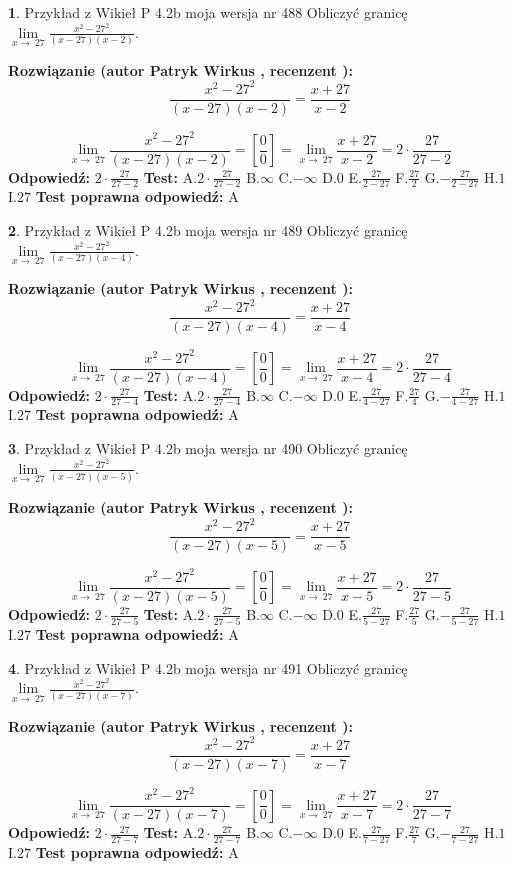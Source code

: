\documentclass[12pt, a4paper]{article}
\theoremstyle{definition} %
\newtheorem{zad}{}
\newcommand{\zadStart}[1]{\begin{zad}#1\newline}
\newcommand{\zadStop}{\end{zad}}
\newcommand{\rozwStart}[2]{\noindent \textbf{Rozwiązanie (autor #1 , recenzent #2): }\newline}
\newcommand{\rozwStop}{\newline}
\newcommand{\odpStart}{\noindent \textbf{Odpowiedź:}\newline}
\newcommand{\odpStop}{\newline}
\newcommand{\testStart}{\noindent \textbf{Test:}\newline}
\newcommand{\testStop}{\newline}
\newcommand{\kluczStart}{\noindent \textbf{Test poprawna odpowiedź:}\newline}
\newcommand{\kluczStop}{\newline}
\begin{document}
\zadStart{Przykład z Wikieł P 4.2b moja wersja nr 488}
Obliczyć granicę $\lim\limits_{x\to\ 27}\frac{x^{2}-27^{2}}{(x-27)(x-2)}$.
\zadStop
\rozwStart{Patryk Wirkus}{}
$$\frac{x^{2}-27^{2}}{(x-27)(x-2)}=\frac{x+27}{x-2}$$

$$\lim\limits_{x\to\ 27}\frac{x^{2}-27^{2}}{(x-27)(x-2)}=[\frac{0}{0}]=\lim\limits_{x\to\ 27}\frac{x+27}{x-2}=2 \cdot \frac{27}{27-2}$$
\rozwStop
\odpStart
$2 \cdot \frac{27}{27-2}$
\odpStop
\testStart
A.$2 \cdot \frac{27}{27-2}$
B.$\infty$
C.$-\infty$
D.$0$
E.$\frac{27}{2-27}$
F.$\frac{27}{2}$
G.$-\frac{27}{2-27}$
H.$1$
I.$27$
\testStop
\kluczStart
A
\kluczStop



\zadStart{Przykład z Wikieł P 4.2b moja wersja nr 489}
Obliczyć granicę $\lim\limits_{x\to\ 27}\frac{x^{2}-27^{2}}{(x-27)(x-4)}$.
\zadStop
\rozwStart{Patryk Wirkus}{}
$$\frac{x^{2}-27^{2}}{(x-27)(x-4)}=\frac{x+27}{x-4}$$

$$\lim\limits_{x\to\ 27}\frac{x^{2}-27^{2}}{(x-27)(x-4)}=[\frac{0}{0}]=\lim\limits_{x\to\ 27}\frac{x+27}{x-4}=2 \cdot \frac{27}{27-4}$$
\rozwStop
\odpStart
$2 \cdot \frac{27}{27-4}$
\odpStop
\testStart
A.$2 \cdot \frac{27}{27-4}$
B.$\infty$
C.$-\infty$
D.$0$
E.$\frac{27}{4-27}$
F.$\frac{27}{4}$
G.$-\frac{27}{4-27}$
H.$1$
I.$27$
\testStop
\kluczStart
A
\kluczStop



\zadStart{Przykład z Wikieł P 4.2b moja wersja nr 490}
Obliczyć granicę $\lim\limits_{x\to\ 27}\frac{x^{2}-27^{2}}{(x-27)(x-5)}$.
\zadStop
\rozwStart{Patryk Wirkus}{}
$$\frac{x^{2}-27^{2}}{(x-27)(x-5)}=\frac{x+27}{x-5}$$

$$\lim\limits_{x\to\ 27}\frac{x^{2}-27^{2}}{(x-27)(x-5)}=[\frac{0}{0}]=\lim\limits_{x\to\ 27}\frac{x+27}{x-5}=2 \cdot \frac{27}{27-5}$$
\rozwStop
\odpStart
$2 \cdot \frac{27}{27-5}$
\odpStop
\testStart
A.$2 \cdot \frac{27}{27-5}$
B.$\infty$
C.$-\infty$
D.$0$
E.$\frac{27}{5-27}$
F.$\frac{27}{5}$
G.$-\frac{27}{5-27}$
H.$1$
I.$27$
\testStop
\kluczStart
A
\kluczStop



\zadStart{Przykład z Wikieł P 4.2b moja wersja nr 491}
Obliczyć granicę $\lim\limits_{x\to\ 27}\frac{x^{2}-27^{2}}{(x-27)(x-7)}$.
\zadStop
\rozwStart{Patryk Wirkus}{}
$$\frac{x^{2}-27^{2}}{(x-27)(x-7)}=\frac{x+27}{x-7}$$

$$\lim\limits_{x\to\ 27}\frac{x^{2}-27^{2}}{(x-27)(x-7)}=[\frac{0}{0}]=\lim\limits_{x\to\ 27}\frac{x+27}{x-7}=2 \cdot \frac{27}{27-7}$$
\rozwStop
\odpStart
$2 \cdot \frac{27}{27-7}$
\odpStop
\testStart
A.$2 \cdot \frac{27}{27-7}$
B.$\infty$
C.$-\infty$
D.$0$
E.$\frac{27}{7-27}$
F.$\frac{27}{7}$
G.$-\frac{27}{7-27}$
H.$1$
I.$27$
\testStop
\kluczStart
A
\kluczStop
\end{document}

